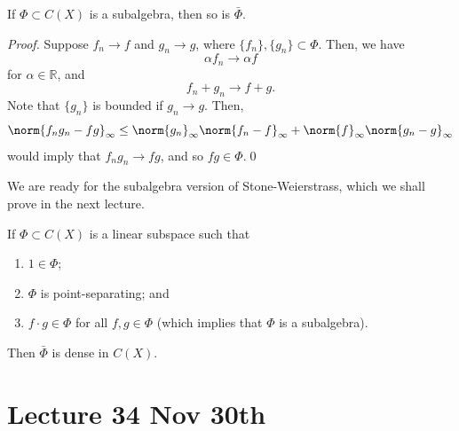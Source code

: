 \documentclass[notoc,notitlepage]{tufte-book}
\begin{document}
\begin{lemma}\label{lemma:closure_of_a_subalgebra_is_a_subalgebra}
  If $\Phi \subset C(X)$ is a subalgebra, then so is $\bar{\Phi}$.
\end{lemma}

\begin{proof}
  Suppose $f_n \to f$ and $g_n \to g$, where $\{ f_n \}, \{ g_n \} \subset \Phi$. Then, we have
  \begin{equation*}
    \alpha f_n \to \alpha f
  \end{equation*}
  for $\alpha \in \mathbb{R}$, and
  \begin{equation*}
    f_n + g_n \to f + g.
  \end{equation*}
  Note that $\{ g_n \}$ is bounded if $g_n \to g$. Then,
  \begin{equation*}
    \norm{ f_n g_n - f g }_\infty \leq \norm{ g_n }_\infty \norm{ f_n - f }_\infty + \norm{ f }_\infty \norm{ g_n - g }_\infty
  \end{equation*}
  would imply that $f_n g_n \to fg$, and so $fg \in \Phi$.\qed\
\end{proof}

We are ready for the subalgebra version of Stone-Weierstrass, which we shall prove in the next lecture.

\begin{thmnonum}
  If $\Phi \subset C(X)$ is a linear subspace such that
  \begin{enumerate}
    \item $1 \in \Phi$;
    \item $\Phi$ is point-separating; and
    \item $f \cdot g \in \Phi$ for all $f, g \in \Phi$ (which implies that $\Phi$ is a subalgebra).
  \end{enumerate}
  Then $\bar{\Phi}$ is dense in $C(X)$.
\end{thmnonum}





\chapter{Lecture 34 Nov 30th}%
\label{chp:lecture_34_nov_30th}
\end{document}
